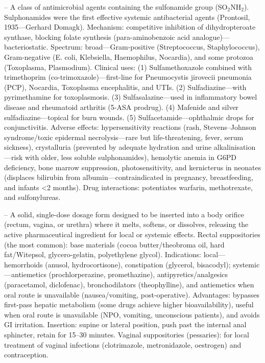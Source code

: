 -- A class of antimicrobial agents containing the sulfonamide group (SO$_2$NH$_2$). Sulphonamides were the first effective systemic antibacterial agents (Prontosil, 1935—Gerhard Domagk). Mechanism: competitive inhibition of dihydropteroate synthase, blocking folate synthesis (para-aminobenzoic acid analogue)—bacteriostatic. Spectrum: broad—Gram-positive (Streptococcus, Staphylococcus), Gram-negative (E. coli, Klebsiella, Haemophilus, Nocardia), and some protozoa (Toxoplasma, Plasmodium). Clinical uses: (1) Sulfamethoxazole combined with trimethoprim (co-trimoxazole)—first-line for Pneumocystis jirovecii pneumonia (PCP), Nocardia, Toxoplasma encephalitis, and UTIs. (2) Sulfadiazine—with pyrimethamine for toxoplasmosis. (3) Sulfasalazine—used in inflammatory bowel disease and rheumatoid arthritis (5-ASA prodrug). (4) Mafenide and silver sulfadiazine—topical for burn wounds. (5) Sulfacetamide—ophthalmic drops for conjunctivitis. Adverse effects: hypersensitivity reactions (rash, Stevens–Johnson syndrome/toxic epidermal necrolysis—rare but life-threatening, fever, serum sickness), crystalluria (prevented by adequate hydration and urine alkalinisation—risk with older, less soluble sulphonamides), hemolytic anemia in G6PD deficiency, bone marrow suppression, photosensitivity, and kernicterus in neonates (displaces bilirubin from albumin—contraindicated in pregnancy, breastfeeding, and infants <2 months). Drug interactions: potentiates warfarin, methotrexate, and sulfonylureas.

-- A solid, single-dose dosage form designed to be inserted into a body orifice (rectum, vagina, or urethra) where it melts, softens, or dissolves, releasing the active pharmaceutical ingredient for local or systemic effects. Rectal suppositories (the most common): base materials (cocoa butter/theobroma oil, hard fat/Witepsol, glycero-gelatin, polyethylene glycol). Indications: local—hemorrhoids (anusol, hydrocortisone), constipation (glycerol, bisacodyl); systemic—antiemetics (prochlorperazine, promethazine), antipyretics/analgesics (paracetamol, diclofenac), bronchodilators (theophylline), and antiemetics when oral route is unavailable (nausea/vomiting, post-operative). Advantages: bypasses first-pass hepatic metabolism (some drugs achieve higher bioavailability), useful when oral route is unavailable (NPO, vomiting, unconscious patients), and avoids GI irritation. Insertion: supine or lateral position, push past the internal anal sphincter, retain for 15--30 minutes. Vaginal suppositories (pessaries): for local treatment of vaginal infections (clotrimazole, metronidazole, oestrogen) and contraception.

